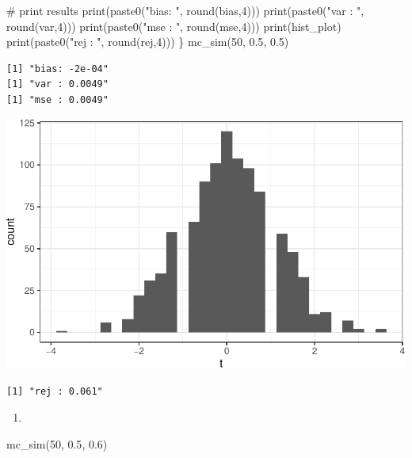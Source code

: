 \documentclass[
  letterpaper,
  DIV=11,
  numbers=noendperiod]{scrreprt}
\newenvironment{Shaded}{\begin{snugshade}}{\end{snugshade}}
\newcommand{\CommentTok}[1]{\textcolor[rgb]{0.37,0.37,0.37}{#1}}
\newcommand{\DecValTok}[1]{\textcolor[rgb]{0.68,0.00,0.00}{#1}}
\newcommand{\FloatTok}[1]{\textcolor[rgb]{0.68,0.00,0.00}{#1}}
\newcommand{\FunctionTok}[1]{\textcolor[rgb]{0.28,0.35,0.67}{#1}}
\newcommand{\NormalTok}[1]{\textcolor[rgb]{0.00,0.23,0.31}{#1}}
\newcommand{\StringTok}[1]{\textcolor[rgb]{0.13,0.47,0.30}{#1}}
\providecommand{\tightlist}{%
  \setlength{\itemsep}{0pt}\setlength{\parskip}{0pt}}\usepackage{longtable,booktabs,array}
\begin{document}
\begin{Shaded}
\begin{Highlighting}[]
  \CommentTok{\# print results}
  \FunctionTok{print}\NormalTok{(}\FunctionTok{paste0}\NormalTok{(}\StringTok{"bias: "}\NormalTok{, }\FunctionTok{round}\NormalTok{(bias,}\DecValTok{4}\NormalTok{)))}
  \FunctionTok{print}\NormalTok{(}\FunctionTok{paste0}\NormalTok{(}\StringTok{"var : "}\NormalTok{, }\FunctionTok{round}\NormalTok{(var,}\DecValTok{4}\NormalTok{)))}
  \FunctionTok{print}\NormalTok{(}\FunctionTok{paste0}\NormalTok{(}\StringTok{"mse : "}\NormalTok{, }\FunctionTok{round}\NormalTok{(mse,}\DecValTok{4}\NormalTok{)))}
  \FunctionTok{print}\NormalTok{(hist\_plot)}
  \FunctionTok{print}\NormalTok{(}\FunctionTok{paste0}\NormalTok{(}\StringTok{"rej : "}\NormalTok{, }\FunctionTok{round}\NormalTok{(rej,}\DecValTok{4}\NormalTok{)))}
\NormalTok{\}}
\FunctionTok{mc\_sim}\NormalTok{(}\DecValTok{50}\NormalTok{, }\FloatTok{0.5}\NormalTok{, }\FloatTok{0.5}\NormalTok{)}
\end{Highlighting}
\end{Shaded}

\begin{verbatim}
[1] "bias: -2e-04"
[1] "var : 0.0049"
[1] "mse : 0.0049"
\end{verbatim}

\includegraphics{07-inference_files/figure-pdf/unnamed-chunk-11-1.pdf}

\begin{verbatim}
[1] "rej : 0.061"
\end{verbatim}

\begin{enumerate}
\def\labelenumi{\arabic{enumi}.}
\setcounter{enumi}{4}
\tightlist
\item
\end{enumerate}

\begin{Shaded}
\begin{Highlighting}[]
\FunctionTok{mc\_sim}\NormalTok{(}\DecValTok{50}\NormalTok{, }\FloatTok{0.5}\NormalTok{, }\FloatTok{0.6}\NormalTok{)}
\end{Highlighting}
\end{Shaded}
\end{document}
